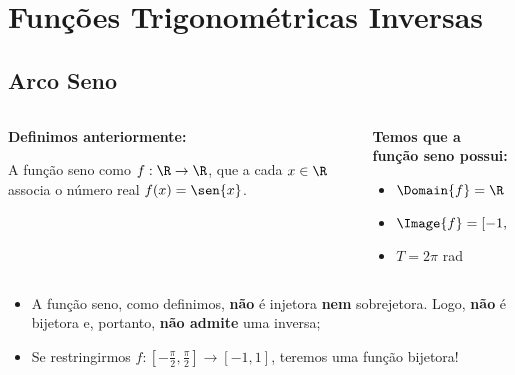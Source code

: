 \section{Funções Trigonométricas Inversas}

\subsection{Arco Seno}
\begin{frame}
  \begin{columns}[onlytextwidth]
    \begin{column}{0.49\textwidth}\vspace{-0.5cm}
      \begin{highlight}
        \textbf{Definimos anteriormente:}

        A função seno como $f:\R\rightarrow\R$, que a cada $x\in\R$ associa o número real $f(x)=\sen{x}$.
      \end{highlight}
    \end{column}
    \begin{column}{0.49\textwidth}\vspace*{-0.5cm}
      \begin{highlight}
        \textbf{Temos que a função seno possui:}
        \begin{itemize}
          \item $\Domain{f} = \R$
          \item $\Image{f} = [-1,\,1]$
          \item $T = 2\pi$ rad
        \end{itemize}
      \end{highlight}
    \end{column}
  \end{columns}
  \begin{figure}
  \end{figure}
  \vspace*{-1.2em}
  \begin{itemize}
    \item A função seno, como definimos, \textbf{não} é injetora \textbf{nem} sobrejetora. Logo, \textbf{não} é bijetora e, portanto, \textbf{não admite} uma inversa;
    \item<2> Se restringirmos $f:\left[-\frac{\pi}{2},\frac{\pi}{2}\right]\rightarrow[-1,1]$, teremos uma função bijetora!
  \end{itemize}
\end{frame}

